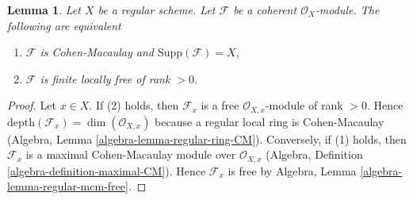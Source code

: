 \documentclass[10pt,a4paper]{amsart}
\theoremstyle{plain}
\newtheorem{lemma}[subsection]{Lemma}
\theoremstyle{definition}
\theoremstyle{remark}
\numberwithin{equation}{subsection}
\begin{document}
\begin{lemma}
\label{lemma-Cohen-Macaulay-over-regular}
Let $X$ be a regular scheme. Let $\mathcal{F}$ be a coherent
$\mathcal{O}_X$-module. The following are equivalent
\begin{enumerate}
\item $\mathcal{F}$ is Cohen-Macaulay and $\text{Supp}(\mathcal{F}) = X$,
\item $\mathcal{F}$ is finite locally free of rank $> 0$.
\end{enumerate}
\end{lemma}

\begin{proof}
Let $x \in X$. If (2) holds, then $\mathcal{F}_x$ is a free
$\mathcal{O}_{X, x}$-module of rank $> 0$. Hence
$\text{depth}(\mathcal{F}_x) = \dim(\mathcal{O}_{X, x})$
because a regular local ring is Cohen-Macaulay
(Algebra, Lemma \ref{algebra-lemma-regular-ring-CM}).
Conversely, if (1) holds, then $\mathcal{F}_x$ is a
maximal Cohen-Macaulay module over $\mathcal{O}_{X, x}$
(Algebra, Definition \ref{algebra-definition-maximal-CM}).
Hence $\mathcal{F}_x$ is free by
Algebra, Lemma \ref{algebra-lemma-regular-mcm-free}.
\end{proof}
\end{document}
